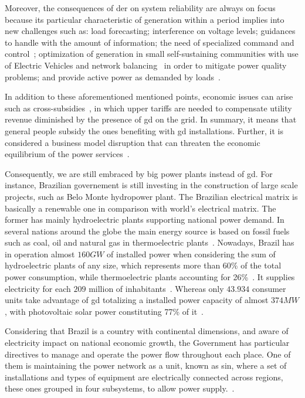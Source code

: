 Moreover, the consequences of \gls{der} on system reliability are always on focus because its particular characteristic of generation within a period implies into new challenges such as:
load forecasting;
interference on voltage levels;
guidances to handle with the amount of information;
the need of specialized command and control~\cite{debra2017};
optimization of generation in small self-sustaining communities with use of Electric Vehicles and network balancing~\cite{Coelho2016730} in order to mitigate power quality problems;
and provide active power as demanded by loads~\cite{thomas2017}.

In addition to these aforementioned mentioned points, economic issues can arise such as cross-subsidies~\cite{iea2011,epe2014},
in which upper tariffs are needed to compensate utility revenue diminished by the presence of \gls{gd} on the grid.
In summary, it means that general people subsidy the ones benefiting with \gls{gd} installations.
Further, it is considered a business model disruption that can threaten the economic equilibrium of the power services~\cite{gianelloni2017}.

Consequently, we are still embraced by big power plants instead of \gls{gd}.
For instance, Brazilian governement is still investing in the construction of large scale projects, such as Belo Monte hydropower plant.
The Brazilian electrical matrix is basically a renewable one in comparison with world's electrical matrix.
The former has mainly hydroelectric plants supporting national power demand.
In several nations around the globe the main energy source is based on fossil fuels such as coal, oil and natural gas in thermoelectric plants~\cite{abcdenergia}.
Nowadays, Brazil has in operation almost $160GW$ of installed power when considering the sum of hydroelectric plants of any size, which represents more than 60\% of the total power consumption, while thermoelectric plants accounting for 26\%~\cite{BIG2}.
It supplies electricity for each $209$ million of inhabitants~\cite{ibge-pop}.
Whereas only $43.934$ consumer units take advantage of \gls{gd} totalizing a installed power capacity of almost $374MW$,
with photovoltaic solar power constituting 77\% of it~\cite{BIG2}.

Considering that Brazil is a country with continental dimensions, and aware of electricity impact on national economic growth, the Government has particular directives to manage and operate the power flow throughout each place.
One of them is maintaining the power network as a unit, known as \gls{sin}, where a set of installations and types of equipment are electrically connected across regions, these ones grouped in four subsystems, to allow power supply.~\cite{sin}.

